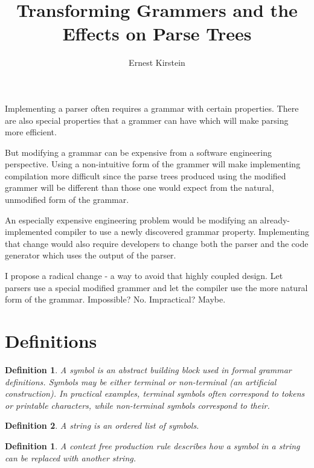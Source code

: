 \documentclass[11pt]{article}
\newtheorem{definition}{Definition}
\begin{document}
\title{Transforming Grammers and the Effects on Parse Trees}
\author{Ernest Kirstein}
\maketitle

Implementing a parser often requires a grammar with certain properties.
\cite{lewis, compiler}
There are also special properties that a grammer can have which will make
parsing more efficient. \cite{compiler, reghizzi}

But modifying a grammar can be expensive from a software engineering perspective.
Using a non-intuitive form of the grammer will make implementing compilation 
more difficult since the parse trees produced using the modified grammer will
be different than those one would expect from the natural, unmodified form of the
grammar.

An especially expensive engineering problem would be modifying an already-implemented
compiler to use a newly discovered grammar property. Implementing that change
would also require developers to change both the parser and the code generator
which uses the output of the parser.

I propose a radical change - a way to avoid that highly coupled design. Let parsers
use a special modified grammer and let the compiler use the more natural form of
the grammar. Impossible? No. Impractical? Maybe.

\section{Definitions}

\begin{definition}
\label{symbol}
A {\em symbol} is an abstract building block used in formal grammar definitions.
Symbols may be either {\em terminal} or {\em non-terminal} (an artificial construction).
In practical examples, terminal symbols often correspond to tokens or printable characters, 
while non-terminal symbols correspond to their.
\end{definition}

\begin{definition}
A {\em string} is an ordered list of symbols.
\end{definition}

\newtheorem{prodrule}{Definition}
\begin{prodrule}
A \em{context free production rule} describes how a symbol in
a string can be replaced with another string.
\end{prodrule}
\end{document}
